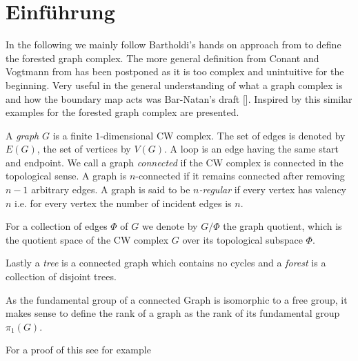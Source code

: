 %

\usepackage{todonotes}
\usepackage{./tikzit/tikzit}
\usepackage{biblatex}



	

\section{Einführung}
In the following we mainly follow Bartholdi's hands on approach from \cite{bartholdi16} to define the forested graph complex.
The more general definition from Conant and Vogtmann from \cite{conant03} has been postponed as it is too complex and unintuitive for the beginning.
Very useful in the general understanding of  what a graph complex is and how the boundary map acts was Bar-Natan's draft [].
Inspired by this similar examples for the forested graph complex are presented.

\begin{definition}
	A \emph{graph} $G$ is a finite $1$-dimensional CW complex. The set of edges is denoted by $E(G)$, the set of vertices by  $V(G)$.
	A loop is an edge having the same start and endpoint.
	We call a graph \emph{connected} if the CW complex is connected in the topological sense.
	A graph is $n$-connected if it remains connected after removing  $n-1$ arbitrary edges.
	A graph is said to be \emph{$n$-regular} if every vertex has valency $n$ i.e. for every vertex the number of incident edges is $n$.

	For a collection of edges $\Phi$ of $G$ we denote by $G / \Phi$ the graph quotient, which is the quotient space of the CW complex $G$ over its topological subspace $\Phi$.

	Lastly a \emph{tree} is a connected graph which contains no cycles and a \emph{forest} is a collection of disjoint trees.
\end{definition}

\begin{definition}
	As the fundamental group of a connected Graph is isomorphic to a free group, it makes sense to define the rank of a graph as the rank of its fundamental group $\pi_{1}(G)$.
\end{definition}

For a proof of this see for example \cite[p. 43f]{hatcher00}

